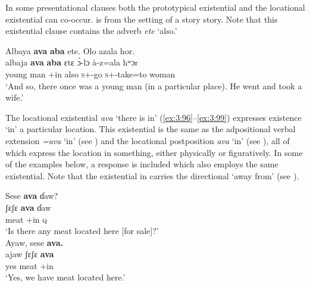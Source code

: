 In some presentational clauses both the prototypical existential and the locational existential can co-occur.   is from the setting of a story story. Note that this existential clause contains the adverb \textit{ete} ‘also.’

\ea \label{ex:3:95}
Albaya  \textbf{ava}  \textbf{aba}  ete.  Olo  azala  hor.\\
\gll  albaja  \textbf{ava}    \textbf{aba}  ɛtɛ   \`{ɔ}-lɔ    à-z=ala    hʷɔr\\
      {young man}  {\EXT}+in   {\EXT}  also  \textsc{s}+{\PFV}-go    \textsc{s}+{\PFV}-take=to    woman\\
\glt  ‘And so, there once was a young man (in a particular place). He went and took a wife.’
\z

The locational existential \textit{ava} ‘there is in’ (\ref{ex:3:96}--\ref{ex:3:99}) expresses existence ‘in’ a particular location. This existential is the same as the adpositional verbal extension \textit{=ava} ‘in’ (see ) and the locational postposition \textit{ava} ‘in’ (see ), all of which express the location in something, either physically or figuratively. In some of the examples below, a response is included which also employs the same existential. Note that the existential in  carries the directional ‘away from’ (see ).

\ea\label{ex:3:96}
\ea Sese  \textbf{ava}  ɗaw? \\
\gll  ʃɛʃɛ    \textbf{ava}  ɗaw   \\
      meat  {\EXT}+in  {\textsc{q}}   \\
\glt  ‘Is there any meat located here [for sale]?’  \\

\medskip
\ex
Ayaw,  sese  \textbf{ava.}\\
\gll ajaw  ʃɛʃɛ  \textbf{ava}\\
     yes  meat  {\EXT}+in\\
\glt ‘Yes, we have meat located here.’\\
\z\z

